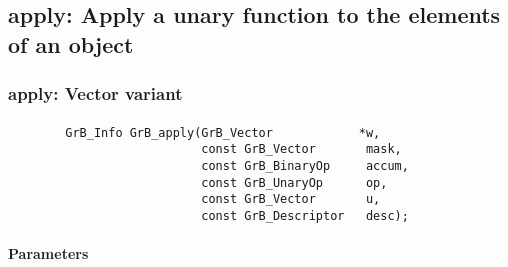 \subsection{{\sf apply}: Apply a unary function to the elements of an object}


\subsubsection{{\sf apply}: Vector variant}
\paragraph{\syntax}

\begin{verbatim}
        GrB_Info GrB_apply(GrB_Vector            *w,
                           const GrB_Vector       mask,
                           const GrB_BinaryOp     accum,
                           const GrB_UnaryOp      op,
                           const GrB_Vector       u,
                           const GrB_Descriptor   desc);
\end{verbatim}

\paragraph{Parameters}

